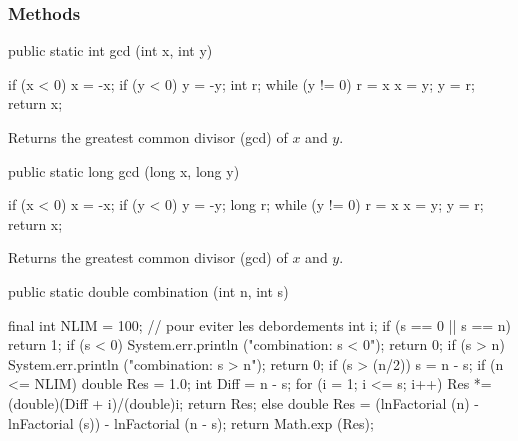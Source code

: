\subsubsection* {Methods}

\begin{code}

   public static int gcd (int x, int y)\begin{hide} {
      if (x < 0) x = -x;
      if (y < 0) y = -y;
      int r;
      while (y != 0) {
         r = x %
         x = y;
         y = r;
      }
      return x;
   }\end{hide}
\end{code}
 \begin{tabb} Returns the greatest common divisor (gcd) of $x$ and $y$.
 \end{tabb}
 \begin{htmlonly}
 \end{htmlonly}
\begin{code}

   public static long gcd (long x, long y)\begin{hide} {
      if (x < 0) x = -x;
      if (y < 0) y = -y;
      long r;
      while (y != 0) {
         r = x %
         x = y;
         y = r;
      }
      return x;
   }\end{hide}
\end{code}
 \begin{tabb} Returns the greatest common divisor (gcd) of $x$ and $y$.
 \end{tabb}
 \begin{htmlonly}
 \end{htmlonly}
\begin{code}

   public static double combination (int n, int s)\begin{hide} {
      final int NLIM = 100;      // pour eviter les debordements
      int i;
      if (s == 0 || s == n)
         return 1;
      if (s < 0) {
         System.err.println ("combination:   s < 0");
         return 0;
      }
      if (s > n) {
         System.err.println ("combination:   s > n");
         return 0;
      }
      if (s > (n/2))
         s = n - s;
      if (n <= NLIM) {
         double Res = 1.0;
         int Diff = n - s;
         for (i = 1; i <= s; i++) {
            Res *= (double)(Diff + i)/(double)i;
         }
         return Res;
      }
      else {
         double Res = (lnFactorial (n) - lnFactorial (s))
            - lnFactorial (n - s);
         return Math.exp (Res);
      }
   }
\end{hide}
\end{code}
